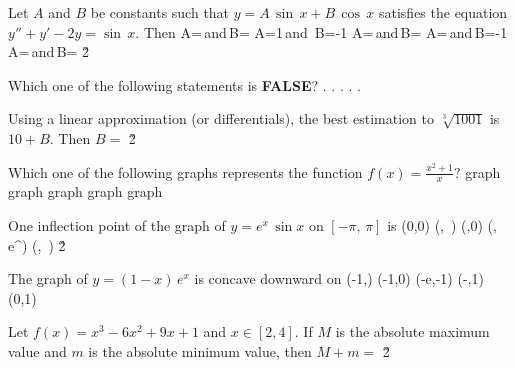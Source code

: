 \documentclass[amsfonts,bezier,leqno,fleqn,12pt,a4paper]{article}
\begin{document}
{\begin{large}
\newpage



\item %
Let $A$ and $B$ be constants such that $y=A\,\sin\,x+B\,\cos\,x$ satisfies the equation $y''+y'-2y=\sin\,x$. Then
\sc
\be
\displaystyle A=\,\mbox{and}\,B=
\ee
\be
A=1\,\mbox{and}\, B=-1
\ee
\be
\displaystyle A=\,\mbox{and}\,B=
\ee
\be
\displaystyle A=\,\mbox{and}\,B=-1
\ee
\be
\displaystyle A=\,\mbox{and}\,B=
\ee
\v2



\item %
Which one of the following statements is \textbf{FALSE}?
\sc
\be
.
\ee
\be
.
\ee
\be
.
\ee
\be
.
\ee
\be
.
\ee

\newpage



\item %
Using a linear approximation (or differentials), the best estimation to $\sqrt[3]{1001}$ is $10+B.$ Then $B=$
\sc
\be
\displaystyle {}
\ee
\be
\displaystyle {}
\ee
\be
\displaystyle {}
\ee
\be
\displaystyle {}
\ee
\be
\displaystyle {}
\ee
\v2



\item %
Which one of the following graphs represents the function $\displaystyle f(x)=\frac{x^{2}+1}{x}?$
\sc
\be
\mbox{graph}
\ee
\be
\mbox{graph}
\ee
\be
\mbox{graph}
\ee
\be
\mbox{graph}
\ee
\be
\mbox{graph}
\ee

\newpage



\item %
One inflection point of the graph of $y=e^x\,\sin x$ on $[-\pi,\,\pi]$ is
\sc
\be
(0,0)
\ee
\be
\displaystyle \left(,\, \right)
\ee
\be
(\pi,0)
\ee
\be
\displaystyle \left(,\, e^{}\right)
\ee
\be
\displaystyle \left(,\, \right)
\ee
\v2



\item %
The graph of $y=(1-x)\,e^x$ is concave downward on
\sc
\be
\displaystyle (-1,\infty)
\ee
\be
(-1,0)
\ee
\be
(-e,-1)
\ee
\be
(-\infty,1)
\ee
\be
(0,1)
\ee

\newpage



\item %
Let $f(x)=x^3-6x^2+9x+1$ and $x\in[2,4].$ If $M$ is the absolute maximum value and $m$ is the absolute minimum value, then $M+m=$
\sc
{}
\ee
{}
\ee
{}
\ee
{}
\ee
{}
\ee
\v2




\end{large}}
\end{document}
